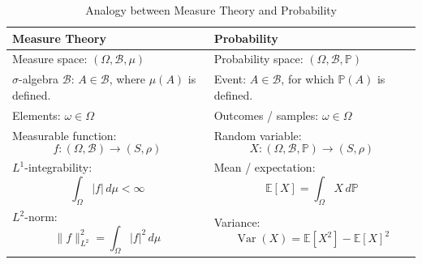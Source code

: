 \begin{table}[H]
    \centering
    \caption{Analogy between Measure Theory and Probability}
    \label{tab:measure-probability}

    \renewcommand{\arraystretch}{1.35}

    \begin{tabularx}{\textwidth}{
        >{\raggedright\arraybackslash}X
        >{\raggedright\arraybackslash}X
    }

        \hline

        \textbf{Measure Theory}
        &
        \textbf{Probability}
        \\

        \hline

        Measure space:
        \(\left(\Omega,\mathcal{B},\mu\right)\)
        &
        Probability space:
        \(\left(\Omega,\mathcal{B},\mathbb{P}\right)
        \)

        \\[1ex]

        $\sigma$-algebra $\mathcal{B}$:
        \(A\in\mathcal{B}\), where $\mu(A)$ is defined.
        &
        Event:
        \(A\in\mathcal{B}\), for which
        \(\mathbb{P}(A)\) is defined.

        \\[1ex]

        Elements:
        \(\omega\in\Omega\)
        &
        Outcomes / samples:
        \(\omega\in\Omega\)

        \\[1ex]

        Measurable function:
        \[
        f:(\Omega,\mathcal{B})
        \longrightarrow
        (S,\rho)
        \]
        &
        Random variable:
        \[
        X:(\Omega,\mathcal{B},\mathbb{P})
        \longrightarrow
        (S,\rho)
        \]

        \\[1ex]

        $L^1$-integrability:
        \[
        \int_\Omega |f|\,d\mu<\infty
        \]
        &
        Mean / expectation:
        \[
        \mathbb{E}[X]
        =
        \int_\Omega X\,d\mathbb{P}
        \]

        \\[1ex]

        $L^2$-norm:
        \[
        \|f\|_{L^2}^2
        =
        \int_\Omega |f|^2\,d\mu
        \]
        &
        Variance:
        \[
        \operatorname{Var}(X)
        =
        \mathbb{E}[X^2]
        -
        \mathbb{E}[X]^2
        \]


\end{tabularx}
\end{table}
